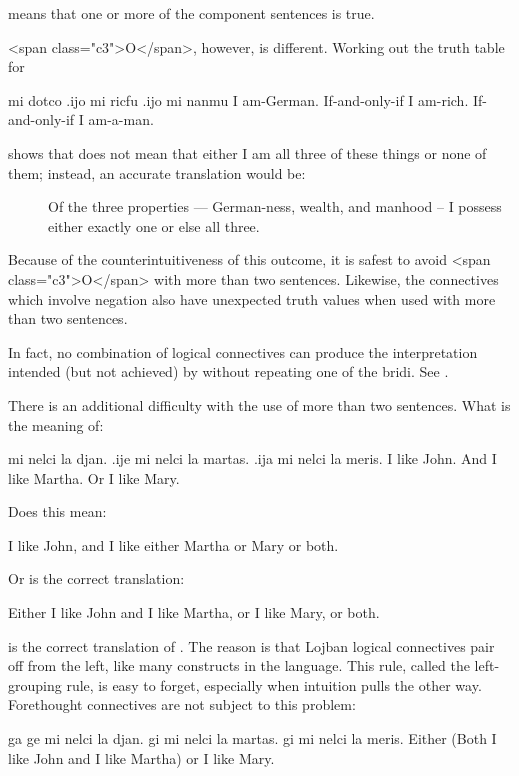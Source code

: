 {\noindent}means that one or more of the component sentences is true. 

<span class="c3">O</span>, however, is different. Working
    out the truth table for
\begin{example}
mi dotco .ijo mi ricfu\n
\T	.ijo mi nanmu\n
I am-German.  If-and-only-if I am-rich.\n
\T	If-and-only-if I am-a-man.
\end{example}

{\noindent}shows that  does not mean that
    either I am all three of these things or none of them; instead,
    an accurate translation would be: 
\begin{description}
\item[] Of the three properties --- German-ness, wealth, and manhood -- I possess either exactly one or else all three.
\end{description}

Because of the counterintuitiveness of this outcome, it is
    safest to avoid <span class="c3">O</span> with more than two
    sentences. Likewise, the connectives which involve negation
    also have unexpected truth values when used with more than two
    sentences. 

In fact, no combination of logical connectives can produce
    the  interpretation intended (but not achieved)
    by  without repeating one of the
    bridi. See .

There is an additional difficulty with the use of more than
    two sentences. What is the meaning of:
\begin{example}
mi nelci la djan. .ije mi nelci la martas.\n
\T	.ija mi nelci la meris.\n
I like John.  And I like Martha.\n
\T	Or I like Mary.
\end{example}

Does this mean:
\begin{example}
I like John, and I like\n
\T	either Martha or Mary or both.
\end{example}

Or is the correct translation:
\begin{example}
Either I like John and I like Martha,\n
\T	or I like Mary, or both.
\end{example}

 is the correct translation of
    . The reason is that Lojban
    logical connectives pair off from the left, like many
    constructs in the language. This rule, called the left-grouping
    rule, is easy to forget, especially when intuition pulls the
    other way. Forethought connectives are not subject to this
    problem:
\begin{example}
ga ge mi nelci la djan. gi mi nelci la martas.\n
\T	gi mi nelci la meris.\n
Either (Both I like John and I like Martha)\n
\T	or I like Mary.
\end{example}

